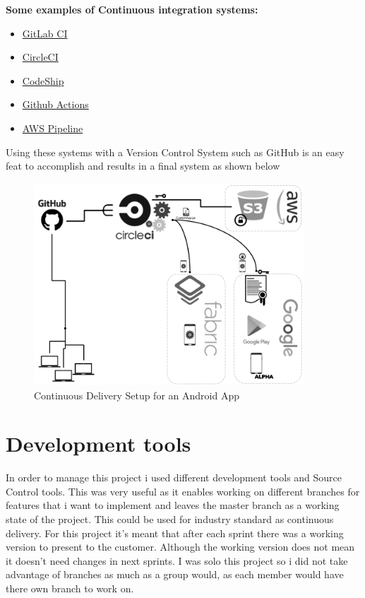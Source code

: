\textbf{Some examples of Continuous integration systems:}
\begin{itemize}
    \item \hyperlink{https://docs.gitlab.com/ee/ci/}{GitLab CI}
    \item \hyperlink{https://circleci.com/docs/2.0/about-circleci}{CircleCI}
    \item \hyperlink{https://documentation.codeship.com/basic/quickstart/getting-started}{CodeShip}
    \item \hyperlink{https://github.com/features/actions}{Github Actions}
    \item \hyperlink{https://aws.amazon.com/getting-started/projects/set-up-ci-cd-pipeline}{AWS Pipeline}
\end{itemize}

Using these systems with a Version Control System such as GitHub is an easy feat to accomplish and results in a final system as shown below

\begin{figure}[h!]
	\caption{Continuous Delivery Setup for an Android App \cite{Cont_delivery_1}}
	\label{image:myImageName}
	\centering
	\includegraphics[width=0.9\textwidth]{Images/CICDFINAL.png}
\end{figure}	
\newpage
\section{Development tools}
In order to manage this project i used different development tools and Source Control tools. This was very useful as it enables working on different branches for features that i want to implement and leaves the master branch as a working state of the project. This could be used for industry standard as continuous delivery. For this project it's meant that after each sprint there was a working version to present to the customer. Although the working version does not mean it doesn't need changes in next sprints. I was solo this project so i did not take advantage of branches as much as a group would, as each member would have there own branch to work on.

